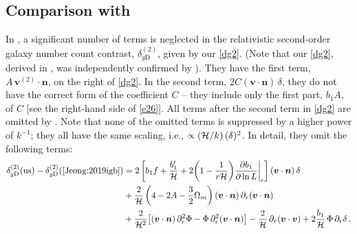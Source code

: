 \subsection*{{Comparison with \cite{Jeong:2019igb}}}

In \cite{Jeong:2019igb},  
a significant number of terms is neglected in the relativistic second-order  galaxy number count contrast, $\delta_{g\mathrm{D}}^{(2)}$, given by our \eqref{dg2}. (Note that our  \eqref{dg2}, derived in \cite{Clarkson:2018dwn}, was independently confirmed by \cite{DiDio:2018zmk}). They have the first term, $A\, \bm{v}^{(2)}\!\!\cdot\bm{n}$, on the right of \eqref{dg2}.  In the second term, $2{C}(\bm{v}\cdot\bm{n})\,\delta$, they do not have the correct form of the coefficient $C$ -- they include only the first part, $b_1A$, of $C$ [see the right-hand side of \eqref{e26}]. All terms after the second term in \eqref{dg2} are omitted by \cite{Jeong:2019igb}. Note that none of the omitted terms is suppressed by a higher power of $k^{-1}$;  they all have the same scaling, i.e., $\propto (\mathcal{H}/k)\,{(\delta)^2}$. In detail, they omit the following
terms:
\begin{align}
\delta_{g\mathrm{D}}^{(2)}({\mathrm{us}})- \delta_{g\mathrm{D}}^{(2)}(\mbox{{\cite{Jeong:2019igb}}}) &= 2\left[b_{1}f + \frac{b_1'}{\mathcal{H}} 
+ 2\bigg(1-\frac{1}{{r} \mathcal{H}}\bigg){\frac{\partial b_1}{\partial \ln{L}}\bigg|_{\mathrm{c}}} \right](\bm{v}\cdot\bm{n})\,\delta 
\\\nonumber
& 
+ \frac{2}{\mathcal{H}}\left(4-2A-\frac{3}{2}\Omega_{m} \right)(\bm{v}\cdot\bm{n})\,\partial_r(\bm{v}\cdot\bm{n})\\
\nonumber
&
+ \frac{2}{\mathcal{H}^2}\big[(\bm{v}\cdot\bm{n}) \,\partial_r^2\Phi-\Phi\, \partial_r^2 (\bm{v}\cdot\bm{n}) \big]
 - \frac{2}{\mathcal{H}}\,\partial_r (\bm{v}\cdot\bm{v}) + 2 \frac{b_1}{\mathcal{H}}\,\Phi\, \partial_r\delta \,. 
\end{align}